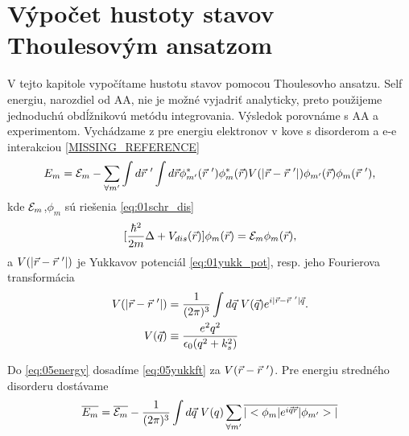 \section{Výpočet hustoty stavov Thoulesovým ansatzom}
V tejto kapitole vypočítame hustotu stavov pomocou Thoulesovho ansatzu. Self energiu, narozdiel od AA, nie je možné vyjadriť analyticky, preto použijeme jednoduchú obdĺžnikovú metódu integrovania. Výsledok porovnáme s AA a experimentom. Vychádzame z pre energiu elektronov v kove s disorderom a e-e interakciou \eqref{MISSING_REFERENCE}
\begin{align}
\label{eq:05energy} 
 E_m=\E_m-\sum_{\forall m'} \int d\vr\ ' \int d\vr \phi_{m'}^*(\vr\ ')\phi_{m}^*(\vr)V(|\vr-\vr\ '|)\phi_{m'}(\vr)\phi_{m}(\vr\ ')\text{,}
\end{align} 
kde $\mathcal{E}_m$,$\phi_m$  sú riešenia \eqref{eq:01schr_dis}
\begin{align}
\label{eq:05schr_dis}
[\frac{\hbar^2}{2m}\Delta+V_{dis}(\vec{r})]\phi_m(\vec{r})=\mathcal{E}_m\phi_m(\vec{r})\text{,}
\end{align}
a $V(|\vr -\vr\ '|)$ je Yukkavov potenciál \eqref{eq:01yukk_pot}, resp. jeho Fourierova transformácia
\begin{align}
\label{eq:05yukkft}
V(|\vr - \vr\ '|) &= \frac{1}{(2\pi)^3}\int d\vq\ V(\vq)e^{i|\vr-\vr\ '|\vq} \text{.} \\
\notag
V(\vq)&\equiv\frac{e^2q^2}{\epsilon_0(q^2+k_s^2)} 
\end{align}

Do \eqref{eq:05energy} dosadíme \eqref{eq:05yukkft} za $V(\vec{r}-\vec{r}\ ')$. Pre energiu stredného disorderu dostávame
\begin{align}
\label{eq:05ergmeandis}
\overline{E_m} =\overline{\mathcal{E}_m} - \frac{1}{(2\pi)^3}\int d\vec{q}\ V(q) \sum_{\forall m'}\overline{|<\phi_m|e^{i\vec{q}\vec{r}}|\phi_{m'}>|}
\end{align}

